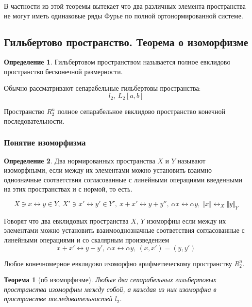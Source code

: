 \documentclass[14pt,a4paper]{extarticle}
\newtheorem{theorem}{Теорема}[section]
\theoremstyle{definition}
\newtheorem{definition}{Определение}[section]
\theoremstyle{remark}
\newcommand{\sep}{ , \ \allowbreak }
\renewcommand{\[}{\begin{dmath*}[compact]}
\renewcommand{\]}{\end{dmath*}}
\begin{document}
В частности из этой теоремы вытекает что два различных элемента пространства
не могут иметь одинаковые ряды Фурье по полной ортонормированной системе.

\subsection{Гильбертово пространство. Теорема о изоморфизме}
\label{subsec:gp_toi}

\begin{definition}
  Гильбертовом пространством называется полное евклидово пространство
  бесконечной размерности.
\end{definition}

Обычно рассматривают сепарабельные гильбертовы пространства:
\[l_2 \sep L_2[a,b]\]

Пространство $R_2^n$ полное сепарабельное евклидово пространство конечной
последовательности.

\subsubsection{Понятие изоморфизма}

\begin{definition}
  Два нормированных пространства $X$ и $Y$ называют изоморфными, если между
  их элементами можно установить взаимно однозначные соответствия
  согласованные с линейными операциями введенными на этих пространствах
  и с нормой, то есть.

  \[X\ni x \leftrightarrow y \in Y \sep
  {X'\ni x' \leftrightarrow y' \in Y'} \sep
  {x + x' \leftrightarrow y + y''} \sep
  {\alpha x \leftrightarrow \alpha y} \sep
  {\Vert x \Vert \leftrightarrow_X \Vert y \Vert_Y}\]
\end{definition}

Говорят что два евклидовых пространства $X$, $Y$ изоморфны если между их
элементами можно установить взаимооднозначные соответствия согласованные
с линейными операциями и со скалярным произведением
\[{x+x' \leftrightarrow y + y'} \sep {\alpha x \leftrightarrow \alpha y}
\sep {(x,x')=(y,y')}\]

Любое конечномерное евклидово изоморфно арифметическому пространству $R_2^n$.

\begin{theorem}[об изоморфизме]
\label{th:об изоморфизме}
  Любые два сепарабельных гильбертовых пространства изоморфны между собой,
  а каждая из них изоморфна в пространстве последовательностей $l_2$.
\end{theorem}
\end{document}
